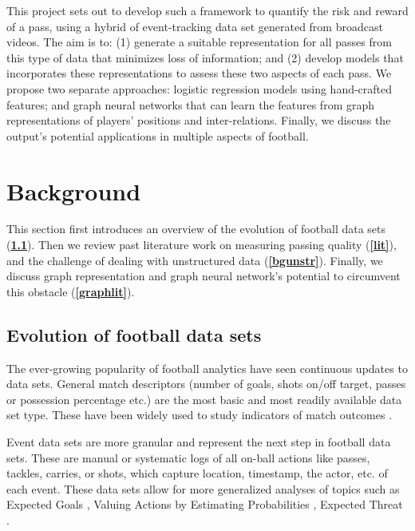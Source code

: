 \documentclass[conference]{IEEEtran}
\begin{document}
This project sets out to develop such a framework to quantify the risk and reward of a pass, using a hybrid of event-tracking data set generated from broadcast videos. The aim is to: (1) generate a suitable representation for all passes from this type of data that minimizes loss of information; and (2) develop models that incorporates these representations to assess these two aspects of each pass. We propose two separate approaches: logistic regression models using hand-crafted features; and graph neural networks that can learn the features from graph representations of players' positions and inter-relations. Finally, we discuss the output's potential applications in multiple aspects of football.











\section{Background}
This section first introduces an overview of the evolution of football data sets (\textbf{\ref{bgdata}}). Then we review past literature work on measuring passing quality (\textbf{\ref{lit}}), and the challenge of dealing with unstructured data (\textbf{\ref{bgunstr}}). Finally, we discuss graph representation and graph neural network's potential to circumvent this obstacle (\textbf{\ref{graphlit}}). 





\subsection{Evolution of football data sets}\label{bgdata}

The ever-growing popularity of football analytics have seen continuous updates to data sets. General match descriptors (number of goals, shots on/off target, passes or possession percentage etc.) are the most basic and most readily available data set type. These have been widely used to study indicators of match outcomes \parencite{penas, Castellano, liu}.

Event data sets are more granular and represent the next step in football data sets. These are manual or systematic logs of all on-ball actions like passes, tackles, carries, or shots, which capture location, timestamp, the actor, etc. of each event. These data sets allow for more generalized analyses of topics such as Expected Goals \parencite{xg}, Valuing Actions by Estimating Probabilities \parencite{decroos}, Expected Threat \parencite{xthreat}. 
\end{document}
